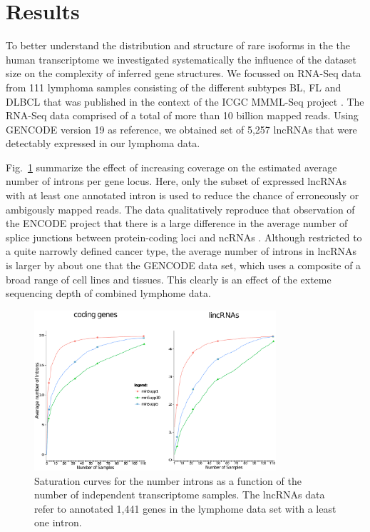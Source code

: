 \documentclass[ncrna,article,submit,moreauthors,pdftex,10pt,a4paper]{mdpi}
\begin{document}
\section{Results}

To better understand the distribution and structure of rare isoforms in the
the human transcriptome we investigated systematically the influence of the
dataset size on the complexity of inferred gene structures. We focussed on
RNA-Seq data from 111 lymphoma samples consisting of the different subtypes
BL, FL and DLBCL that was published in the context of the ICGC MMML-Seq
project \cite{Richter:12a}. The RNA-Seq data comprised of a total of more
than 10 billion mapped reads. Using GENCODE version 19 as reference, we
obtained set of 5,257 lncRNAs that were detectably expressed in our
lymphoma data.

Fig.~\ref{fig:saturation} summarize the effect of increasing coverage on
the estimated average number of introns per gene locus. Here, only the
subset of expressed lncRNAs with at least one annotated intron is used to
reduce the chance of erroneously or ambigously mapped reads. The data
qualitatively reproduce that observation of the ENCODE project that there
is a large difference in the average number of splice junctions between
protein-coding loci and ncRNAs \cite{Derrien:12}. Although restricted to a
quite narrowly defined cancer type, the average number of introns in
lncRNAs is larger by about one that the GENCODE data set, which uses a
composite of a broad range of cell lines and tissues. This clearly is an
effect of the exteme sequencing depth of combined lymphome data. 

\begin{figure}[t]
\begin{center}
  \includegraphics[width=0.8\textwidth]{saturation}
\end{center}
\caption{Saturation curves for the number introns as a function of the 
  number of independent transcriptome samples. The lncRNAs data refer to 
  annotated 1,441 genes in the lymphome data set with a least one intron. 
  }
  \label{fig:saturation} 
\end{figure}
\end{document}
